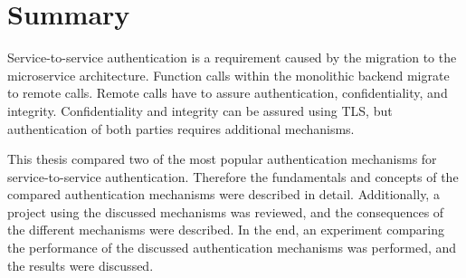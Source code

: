 \section{Summary}
Service-to-service authentication is a requirement caused by the migration to the microservice architecture.
Function calls within the monolithic backend migrate to remote calls.
Remote calls have to assure authentication, confidentiality, and integrity.
Confidentiality and integrity can be assured using TLS, but authentication of both parties requires additional mechanisms.

This thesis compared two of the most popular authentication mechanisms for service-to-service authentication.
Therefore the fundamentals and concepts of the compared authentication mechanisms were described in detail.
Additionally, a project using the discussed mechanisms was reviewed, and the consequences of the different mechanisms were described.
In the end, an experiment comparing the performance of the discussed authentication mechanisms was performed, and the results were discussed.

